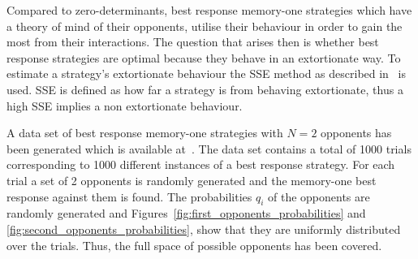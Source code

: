 Compared to zero-determinants, best response memory-one strategies which
have a theory of mind of their opponents, utilise their behaviour in order to
gain the most from their interactions. The question that arises then is whether
best response strategies are optimal because they behave in an extortionate
way. To estimate a strategy's extortionate
behaviour the SSE method as described in~\cite{Knight2019} is used. SSE is
defined as how far a strategy is from behaving extortionate, thus a high
SSE implies a non extortionate behaviour.


A data set of best response memory-one strategies with \(N=2\) opponents has been
generated which is available at~\cite{glynatsi2019}. The data set contains a total of 1000 trials
corresponding to 1000 different instances of a best response strategy. For each
trial a set of 2 opponents is randomly generated and the memory-one best response
against them is found. The probabilities \(q_i\) of the opponents are
randomly generated and Figures~\ref{fig:first_opponents_probabilities} and
\ref{fig:second_opponents_probabilities}, show that they are uniformly
distributed over the trials. Thus, the full space of possible opponents has been
covered.

